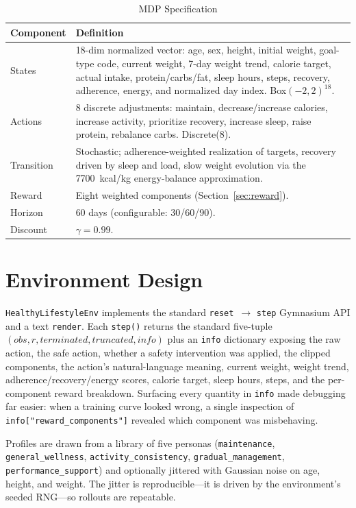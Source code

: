 \documentclass[conference]{IEEEtran}
\newcommand{\code}[1]{\texttt{\small #1}}
\begin{document}
\begin{table}[!t]
\renewcommand{\arraystretch}{1.25}
\caption{MDP Specification}
\label{tab:mdp}
\centering
\footnotesize
\begin{tabular}{@{}p{1.4cm}p{6.0cm}@{}}
\toprule
\textbf{Component} & \textbf{Definition} \\
\midrule
States &
18-dim normalized vector: age, sex, height, initial weight, goal-type code,
current weight, 7-day weight trend, calorie target, actual intake,
protein/carbs/fat, sleep hours, steps, recovery, adherence, energy, and
normalized day index. Box$(-2,2)^{18}$. \\
Actions &
8 discrete adjustments: maintain, decrease/increase calories, increase
activity, prioritize recovery, increase sleep, raise protein, rebalance carbs.
Discrete(8). \\
Transition &
Stochastic; adherence-weighted realization of targets, recovery driven by sleep
and load, slow weight evolution via the 7700~kcal/kg energy-balance
approximation. \\
Reward &
Eight weighted components (Section~\ref{sec:reward}). \\
Horizon &
60 days (configurable: 30/60/90). \\
Discount &
$\gamma = 0.99$. \\
\bottomrule
\end{tabular}
\end{table}

\section{Environment Design}
\code{HealthyLifestyleEnv} implements the standard \code{reset}~$\rightarrow$
\code{step} Gymnasium API \cite{gymnasium} and a text \code{render}. Each
\code{step()} returns the standard five-tuple
$(\mathit{obs}, r, \mathit{terminated}, \mathit{truncated}, \mathit{info})$ plus
an \code{info} dictionary exposing the raw action, the safe action, whether a
safety intervention was applied, the clipped components, the action's
natural-language meaning, current weight, weight trend, adherence/recovery/energy
scores, calorie target, sleep hours, steps, and the per-component reward
breakdown. Surfacing every quantity in \code{info} made debugging far easier:
when a training curve looked wrong, a single inspection of
\code{info["reward\_components"]} revealed which component was misbehaving.

Profiles are drawn from a library of five personas (\code{maintenance},
\code{general\_wellness}, \code{activity\_consistency},
\code{gradual\_management}, \code{performance\_support}) and optionally jittered
with Gaussian noise on age, height, and weight. The jitter is reproducible---it
is driven by the environment's seeded RNG---so rollouts are repeatable.
\end{document}
